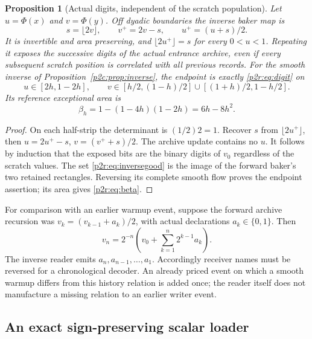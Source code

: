 \documentclass[11pt]{article}
\numberwithin{equation}{section}
\newtheorem{proposition}[theorem]{Proposition}
\theoremstyle{definition}
\theoremstyle{remark}
\begin{document}
\begin{proposition}[Actual digits, independent of the scratch population]
\label{p2r:prop:digits}
Let $u=\Phi(x)$ and $v=\Phi(y)$. Off dyadic boundaries the inverse
baker map is
\begin{equation}\label{p2r:eq:digit}
 s=\lfloor2v\rfloor,\qquad v^+=2v-s,\qquad u^+=(u+s)/2.
\end{equation}
It is invertible and area preserving, and
$\lfloor2u^+\rfloor=s$ for every $0<u<1$. Repeating it exposes the
successive digits of the actual entrance archive, even if every
subsequent scratch position is correlated with all previous records.
For the smooth inverse of Proposition~\ref{p2c:prop:inverse}, the
endpoint is exactly \eqref{p2r:eq:digit} on
\begin{equation}\label{p2r:eq:inversegood}
 u\in[2h,1-2h],\qquad
 v\in[h/2,(1-h)/2]\cup[(1+h)/2,1-h/2].
\end{equation}
Its reference exceptional area is
\begin{equation}\label{p2r:eq:beta}
 \beta_h=1-(1-4h)(1-2h)=6h-8h^2 .
\end{equation}
\end{proposition}
\begin{proof}
On each half-strip the determinant is $(1/2)2=1$.
Recover $s$ from $\lfloor2u^+\rfloor$, then
$u=2u^+-s$, $v=(v^++s)/2$. The archive update contains no $u$.
It follows by induction that the exposed bits are the binary digits
of $v_0$ regardless of the scratch values. The set
\eqref{p2r:eq:inversegood} is the image of the forward baker's two
retained rectangles. Reversing its complete smooth flow proves the
endpoint assertion; its area gives \eqref{p2r:eq:beta}.
\end{proof}

For comparison with an earlier warmup event, suppose the forward
archive recursion was $v_k=(v_{k-1}+a_k)/2$, with actual declarations
$a_k\in\{0,1\}$. Then
\[
 v_n=2^{-n}\left(v_0+\sum_{k=1}^n2^{k-1}a_k\right).
\]
The inverse reader emits $a_n,a_{n-1},\ldots,a_1$.
Accordingly receiver names must be reversed for a chronological
decoder. An already priced event on which a smooth warmup differs
from this history relation is added once; the reader itself does not
manufacture a missing relation to an earlier writer event.

\subsection{An exact sign-preserving scalar loader}
\end{document}
